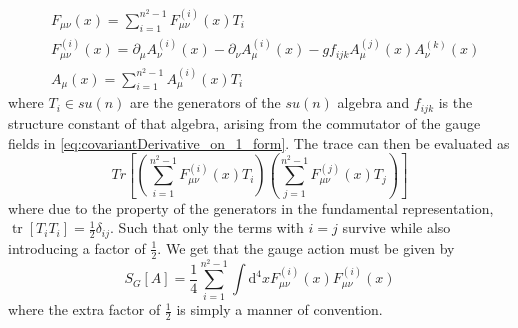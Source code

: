 \documentclass[a4paper,10pt]{book}
\begin{document}
\begin{equation}
\begin{aligned}
&F_{\mu \nu}(x)=\sum_{i=1}^{n^2-1} F_{\mu \nu}^{(i)}(x) T_{i} \\
&F_{\mu \nu}^{(i)}(x)=\partial_{\mu} A_{\nu}^{(i)}(x)-\partial_{\nu} A_{\mu}^{(i)}(x)-gf_{i j k} A_{\mu}^{(j)}(x) A_{\nu}^{(k)}(x)\\
&A_{\mu}(x)=\sum_{i=1}^{n^2-1} A_{\mu}^{(i)}(x) T_{i}
\end{aligned}
\end{equation}
where $T_i \in su(n)$ are the generators of the $su(n)$ algebra and $f_{ijk}$ is the structure constant of that algebra, arising from the commutator of the gauge fields in \eqref{eq:covariantDerivative_on_1_form}. The trace can then be evaluated as
\begin{equation}
Tr\left[ \left( \sum_{i=1}^{n^2-1} F_{\mu \nu}^{(i)}(x) T_{i} \right)\left( \sum_{j=1}^{n^2-1} F_{\mu \nu}^{(j)}(x) T_{j} \right) \right]
\end{equation}
where due to the property of the generators in the fundamental representation, $\operatorname{tr}\left[T_{i} T_{i}\right]=\frac{1}{2} \delta_{i j}$. Such that only the terms with $i=j$ survive while also introducing a factor of $\frac{1}{2}$. We get that the gauge action must be given by 
\begin{equation}\label{eq:continuum_gaugeAction}
S_{G}[A]=\frac{1}{4} \sum_{i=1}^{n^2-1} \int \mathrm{d}^{4} x F_{\mu \nu}^{(i)}(x) F_{\mu \nu}^{(i)}(x)
\end{equation}
where the extra factor of $\frac{1}{2}$ is simply a manner of convention.
\end{document}
